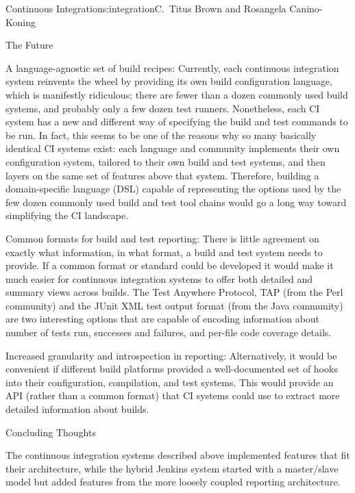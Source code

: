 \begin{aosachapter}{Continuous Integration}{s:integration}{C.\ Titus Brown and Rosangela Canino-Koning}
\begin{aosasect1}{The Future}
\begin{aosadescription}
  \item{A language-agnostic set of build recipes:} Currently,
  each continuous integration system reinvents the wheel by
  providing its own build configuration language, which is
  manifestly ridiculous; there are fewer than a dozen commonly used
  build systems, and probably only a few dozen test
  runners. Nonetheless, each CI system has a new and different way
  of specifying the build and test commands to be run. In fact, this
  seems to be one of the reasons why so many basically identical CI
  systems exist: each language and community implements their own
  configuration system, tailored to their own build and test
  systems, and then layers on the same set of features above that
  system. Therefore, building a domain-specific language (DSL)
  capable of representing the options used by the few dozen commonly
  used build and test tool chains would go a long way toward
  simplifying the CI landscape.

  \item{Common formats for build and test reporting:} There is
  little agreement on exactly what information, in what format, a
  build and test system needs to provide. If a common format or
  standard could be developed it would make it much easier for
  continuous integration systems to offer both detailed and summary
  views across builds. The Test Anywhere Protocol, TAP (from the
  Perl community) and the JUnit XML test output format (from the
  Java community) are two interesting options that are capable of
  encoding information about number of tests run, successes and
  failures, and per-file code coverage details.

  \item{Increased granularity and introspection in reporting:}
  Alternatively, it would be convenient if different build platforms
  provided a well-documented set of hooks into their configuration,
  compilation, and test systems. This would provide an API (rather
  than a common format) that CI systems could use to extract more
  detailed information about builds.

\end{aosadescription}

\begin{aosasect2}{Concluding Thoughts}

The continuous integration systems described above implemented
features that fit their architecture, while the hybrid Jenkins system
started with a master/slave model but added features from the more
loosely coupled reporting architecture.


\end{aosasect2}
\end{aosasect1}
\end{aosachapter}
